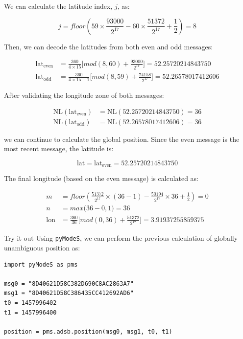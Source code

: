 We can calculate the latitude index, $j$, as:

\begin{equation}
  j = floor \left( 59 \times \frac{93000}{2^{17}} - 60 \times \frac{51372}{2^{17}} + \frac{1}{2}  \right) = 8
\end{equation}

Then, we can decode the latitudes from both even and odd messages:

\begin{equation}
  \begin{split}
    \mathrm{lat}_\mathrm{even} &= \frac{360}{4 \times 15} \Big[ mod(8, 60) + \frac{93000}{2^{17}} \Big] = 52.25720214843750 \\
    \mathrm{lat}_\mathrm{odd} &= \frac{360}{4 \times 15 - 1} \Big[ mod(8, 59) + \frac{74158}{2^{17}} \Big] = 52.26578017412606
  \end{split}
\end{equation}

After validating the longitude zone of both messages:

\begin{equation}
  \begin{split}
    \mathrm{NL}(\mathrm{lat}_\mathrm{even}) &= \mathrm{NL}(52.25720214843750) = 36 \\
    \mathrm{NL}(\mathrm{lat}_\mathrm{odd}) &= \mathrm{NL}(52.26578017412606) = 36
  \end{split}
\end{equation}

we can continue to calculate the global position. Since the even message is the most recent message, the latitude is:

\begin{equation}
  \mathrm{lat} = \mathrm{lat}_\mathrm{even} = 52.25720214843750
\end{equation}

The final longitude (based on the even message) is calculated as:

\begin{align}
  m &= floor \left( \frac{51372}{2^{17}} \times (36-1) - \frac{50194}{2^{17}} \times 36 + \frac{1}{2}  \right) = 0\\
  n &= max \Big( 36-0, 1 \Big) = 36\\
    \mathrm{lon} &= \frac{360}{36} \Big[ mod(0, 36) + \frac{51372}{2^{17}} \Big] = 3.91937255859375
\end{align}

\begin{notebox}{Try it out}
Using \texttt{pyModeS}, we can perform the previous calculation of globally unambiguous position as: 

\begin{verbatim}
import pyModeS as pms

msg0 = "8D40621D58C382D690C8AC2863A7"
msg1 = "8D40621D58C386435CC412692AD6"
t0 = 1457996402
t1 = 1457996400

position = pms.adsb.position(msg0, msg1, t0, t1)
\end{verbatim}

\end{notebox}



